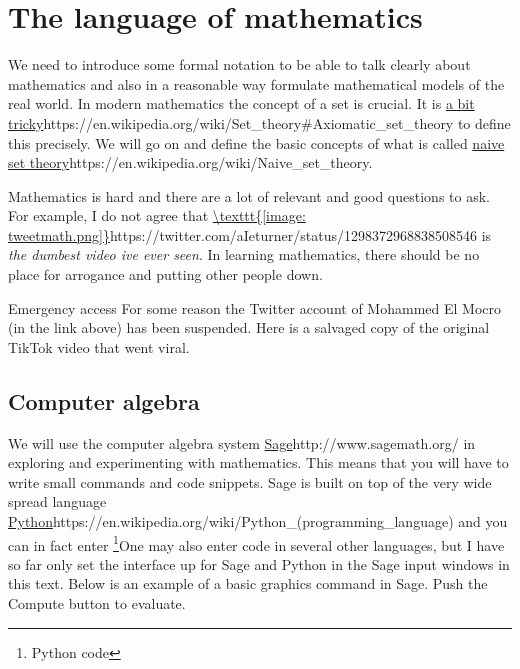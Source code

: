 \documentclass{article}
\begin{document}

\chapter{The language of mathematics}

We need to introduce some formal notation to be able to talk clearly about mathematics and also in a reasonable way 
formulate mathematical models of the real world. In modern mathematics the 
concept of a set is crucial. It is \url{a bit tricky}{https://en.wikipedia.org/wiki/Set_theory\#Axiomatic_set_theory} to define this precisely.
We will go on and define the basic concepts of what is called 
\url{naive set theory}{https://en.wikipedia.org/wiki/Naive_set_theory}.

Mathematics is hard and there are a lot of relevant and good questions
to ask. For example, I do not agree that
\url{\texttt{[image: tweetmath.png]}}{https://twitter.com/aIeturner/status/1298372968838508546}
is \emph{the dumbest video ive ever seen}. In learning mathematics,
there should be no place for arrogance and putting other people down.

\begin{hideinbutton}{Emergency access}
For some reason the Twitter account of Mohammed El Mocro (in the link above) has been suspended. Here is a salvaged copy of the original TikTok video that went viral.




\end{hideinbutton}

\section{Computer algebra}

We will use the computer algebra system
\url{Sage}{http://www.sagemath.org/} in exploring and experimenting
with mathematics. This means that you will have to write small
commands and code snippets. Sage is built on top of the very wide
spread language
\url{Python}{https://en.wikipedia.org/wiki/Python_(programming_language)}
and you can in fact enter \footnote{Python code}{One may also enter code in several other languages, but I have so far only set the interface up for Sage and Python} in
the Sage input windows in this text. Below is an example of a basic
graphics command in Sage.  Push the Compute button to evaluate.
\end{document}
